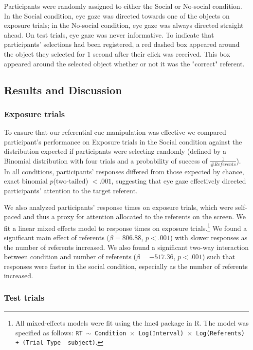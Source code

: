 \documentclass[10pt,letterpaper]{article}
\begin{document}
Participants were randomly assigned to either the Social or No-social condition. In the Social condition, eye gaze was directed towards one of the objects on exposure trials; in the No-social condition, eye gaze was always directed straight ahead. On test trials, eye gaze was never informative. To indicate that participants' selections had been registered, a red dashed box appeared around the object they selected for 1 second after their click was received. This box appeared around the selected object whether or not it was the "correct" referent.

\subsection{Results and Discussion}

\subsubsection{Exposure trials}

To ensure that our referential cue manipulation was effective we compared participant's performance on Exposure trials in the Social condition against the distribution expected if participants were selecting randomly (defined by a Binomial distribution with four trials and a probability of success of $\frac{1}{\# Referents}$). In all conditions, participants' responses differed from those expected by chance, exact binomial  $p$(two-tailed) $< .001$, suggesting that eye gaze effectively directed participants' attention to the target referent. 

We also analyzed participants' response times on exposure trials, which were self-paced and thus a proxy for attention allocated to the referents on the screen. We fit a linear mixed effects  model to response times on exposure trials.\footnote{All mixed-effects models were fit using the lme4 package in R. The model was specified as follows: \texttt{RT $\sim$ Condition~$\times$~Log(Interval)~$\times$~Log(Referents) + (Trial Type \textbar~subject)}.} We found a significant main effect of referents ($\beta=  806.88$, $p< .001$) with slower responses as the number of referents increased. We also found a significant two-way interaction between condition and number of referents ($\beta=  -517.36$, $p< .001$) such that responses were faster in the social condition, especially as the number of referents increased.

\subsubsection{Test trials}
\end{document}
